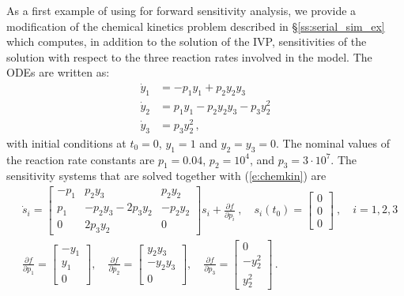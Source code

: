 As a first example of using {\cvodes} for forward sensitivity analysis,
we provide a modification of the chemical kinetics problem described in
\S\ref{ss:serial_sim_ex} which computes, in addition to the solution of the
IVP, sensitivities of the solution with respect to the three reaction rates 
involved in the model.
The ODEs are written as:
\begin{equation}\label{e:chemkin}
  \begin{split}
    {\dot y}_1 &= -p_1 y_1 + p_2 y_2 y_3   \\
    {\dot y}_2 &=  p_1 y_1 - p_2 y_2 y_3 - p_3 y_2^2 \\
    {\dot y}_3 &=  p_3 y_2^2 \, ,
  \end{split}
\end{equation}
with initial conditions at $t_0 = 0$, $y_1 = 1$ and $y_2 = y_3 = 0$. 
The nominal values of the reaction rate constants are 
$p_1 = 0.04$, $p_2 = 10^4$, and $p_3 = 3\cdot 10^7$.
The sensitivity systems that are solved together with (\ref{e:chemkin}) are
\begin{equation}
  \begin{split}
    & {\dot s}_i = 
    \begin{bmatrix}
      - p_1 &   p_2 y_3             &   p_2 y_2 \\
        p_1 & - p_2 y_3 - 2 p_3 y_2 & - p_2 y_2 \\
        0   &             2 p_3 y_2 &  0              
    \end{bmatrix}
    s_i + \frac{\partial f}{\partial p_i} ~,
    \quad s_i(t_0) = \begin{bmatrix} 0 \\ 0 \\ 0 \end{bmatrix}  ~,
    \quad i = 1,2,3 \\
    & \frac{\partial f}{\partial p_1} = \begin{bmatrix} -y_1 \\ y_1 \\ 0 \end{bmatrix}, \quad
    \frac{\partial f}{\partial p_2} = \begin{bmatrix} y_2 y_3 \\ -y_2 y_3 \\ 0 \end{bmatrix}, \quad
    \frac{\partial f}{\partial p_3} = \begin{bmatrix} 0 \\ - y_2^2 \\ y_2^2 \end{bmatrix} \, .
  \end{split}
\end{equation}

